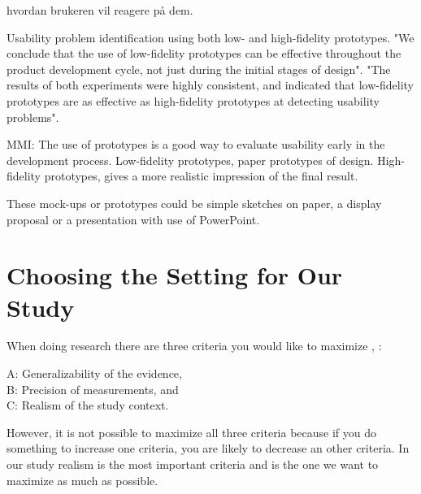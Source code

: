 hvordan brukeren vil reagere på dem.     

Usability problem identification using both low- and high-fidelity prototypes. 
"We conclude that the use of low-fidelity prototypes can be effective throughout the product development cycle, not just during the initial stages of design". "The results of both experiments were highly consistent, and indicated that low-fidelity prototypes are as effective as high-fidelity prototypes at detecting usability problems".


MMI:
The use of prototypes is a good way to evaluate usability early in the development process.
Low-fidelity prototypes, paper prototypes of design.
High-fidelity prototypes, gives a more realistic impression of the final result. 


These mock-ups or prototypes could be simple sketches on paper, a display proposal or a presentation with use of PowerPoint.

\section{Choosing the Setting for Our Study}
\label{sec:experimental}
When doing research there are three criteria you would like to maximize \cite{McGrath}, \cite{alsos}: 
 
A: Generalizability of the evidence, \\
B: Precision of measurements, and \\
C: Realism of the study context.  

However, it is not possible  to maximize all three criteria because if you do something to increase one criteria, you are likely to decrease an other criteria. In our study realism is the most important criteria and is the one we want to maximize as much as possible.


